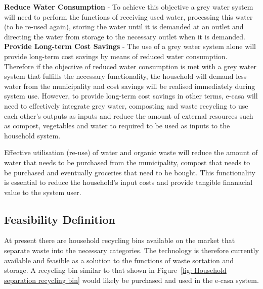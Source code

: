 \documentclass[a4paper,11pt,fleqn]{report}
\begin{document}
\noindent\textbf{Reduce Water Consumption} - To achieve this objective a grey water system will need to perform the functions of receiving used water, processing this water (to be re-used again), storing the water until it is demanded at an outlet and directing the water from storage to the necessary outlet when it is demanded.\\

\noindent\textbf{Provide Long-term Cost Savings} - The use of a grey water system alone will provide long-term cost savings by means of reduced water consumption. Therefore if the objective of reduced water consumption is met with a grey water system that fulfills the necessary functionality, the household will demand less water from the municipality and cost savings will be realised immediately during system use. However, to provide long-term cost savings in other terms, \ac{e-casa} will need to effectively integrate grey water, composting and waste recycling to use each other's outputs as inputs and reduce the amount of external resources such as compost, vegetables and water to required to be used as inputs to the household system.

Effective utilisation (re-use) of water and organic waste will reduce the amount of water that needs to be purchased from the municipality, compost that needs to be purchased and eventually groceries that need to be bought. This functionality is essential to reduce the household's input costs and provide tangible finanacial value to the system user.

\subsection{Feasibility Definition}
At present there are household recycling bins available on the market that separate waste into the necessary categories. The technology is therefore currently available and feasible as a solution to the functions of waste sortation and storage. A recycling bin similar to that shown in Figure~\ref{fig: Household separation recycling bin} would likely be purchased and used in the \ac{e-casa} system.
\end{document}
